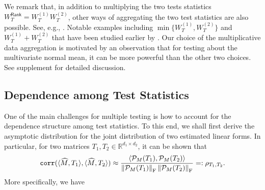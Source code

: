 \documentclass[12pt]{article}
\newcommand{\tF}{{\rm F}}
\newcommand{\norm}[1]{\left\lVert#1\right\rVert}
\newcommand{\R}{\mathbb{R}}
\newcommand{\cP}{\mathcal{P}}
\theoremstyle{plain}
\begin{document}
\begin{sloppypar}
We remark that, in addition to multiplying the two tests statistics $W_T^{\mathsf{Rank}}=W_{T}^{(1)}W_{T}^{(2)}$, other ways of aggregating the two test statistics are also possible. See, e.g., \cite{dai2022false}. Notable examples including $\min\{W_{T}^{(1)},W_{T}^{(2)}\}$ and $W_{T}^{(1)}+W_{T}^{(2)}$ that have been studied earlier by \cite{xing2021controlling,dai2022false,dai2023scale}. Our choice of the multiplicative data aggregation is motivated by an observation that for testing about the multivariate normal mean, it can be more powerful than the other two choices. See supplement for detailed discussion.

\subsection{Dependence among Test Statistics}\label{sec:dependence}
One of the main challenges for multiple testing is how to account for the dependence structure among test statistics. To this end, we shall first derive the asymptotic distribution for the joint distribution of two estimated linear forms. In particular, for two matrices $T_1, T_2\in \R^{d_1\times d_2}$, it can be shown that
\begin{equation}\label{eq:corr}
\texttt{corr}(\langle \widehat{M}, T_1\rangle, \langle \widehat{M}, T_2\rangle)\approx \frac{\left\langle \cP_M(T_1) ,\cP_M(T_2)  \right\rangle }{ \norm{\cP_M(T_1)}_{\tF}\norm{\cP_M(T_2)}_{\tF} }=:	\rho_{T_1,T_2}.
\end{equation}
More specifically, we have



\end{sloppypar}
\end{document}
